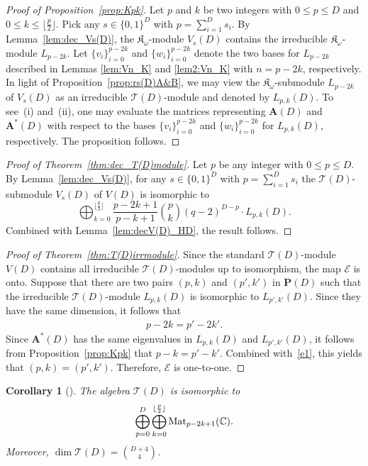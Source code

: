 \documentclass[pdftex]{sigma}%
\def\A{\mathbf A}
\def\C{\mathbb C}
\def\K{\mathfrak K_\omega}
\def\Mat{{\rm Mat}}
\def\T{\mathcal T}
\numberwithin{equation}{section}
\newtheorem{Corollary}[Theorem]{Corollary}
\begin{document}
\begin{proof}[Proof of Proposition~\ref{prop:Kpk}]
Let $p$ and $k$ be two integers with $0\leq p\leq D$ and $0\leq k\leq \lfloor \frac{p}{2}\rfloor$. Pick any $s\in \{0,1\}^D$ with $p=\sum_{i=1}^D s_i$.
By Lemma~\ref{lem:dec_Vs(D)}, the $\K$-module $V_s(D)$ contains the irreducible $\K$-module $L_{p-2k}$. Let $\{v_i\}_{i=0}^{p-2k}$ and $\{w_i\}_{i=0}^{p-2k}$ denote the two bases for $L_{p-2k}$ described in Lemmas \ref{lem:Vn_K} and \ref{lem2:Vn_K} with $n=p-2k$, respectively. In light of Proposition~\ref{prop:rs(D)A&B}, we may view the $\K$-submodule $L_{p-2k}$ of $V_s(D)$ as an irreducible $\T(D)$-module and denoted by $L_{p,k}(D)$.
To see~(i) and~(ii), one may evaluate the matrices representing $\A(D)$ and $\A^*(D)$ with respect to the bases $\{v_i\}_{i=0}^{p-2k}$ and $\{w_i\}_{i=0}^{p-2k}$ for $L_{p,k}(D)$, respectively. The proposition follows.
\end{proof}

\begin{proof}[Proof of Theorem~\ref{thm:dec_T(D)module}]
Let $p$ be any integer with $0\leq p\leq D$.
By Lemma~\ref{lem:dec_Vs(D)}, for any $s\in \{0,1\}^D$ with $p=\sum_{i=1}^D s_i$ the $\T(D)$-submodule $V_s(D)$ of $V(D)$ is isomorphic to
\[
\bigoplus_{k=0}^{\lfloor \frac{p}{2}\rfloor}
\frac{p-2k+1}{p-k+1}{p\choose k}(q-2)^{D-p}\cdot L_{p,k}(D).
\]
Combined with Lemma~\ref{lem:decV(D)_HD}, the result follows.
\end{proof}

\begin{proof}[Proof of Theorem~\ref{thm:T(D)irrmodule}]
Since the standard $\T(D)$-module $V(D)$ contains all irreducible \linebreak $\T(D)$-modules up to isomorphism,
 the map $\mathcal E$ is onto.
 Suppose that there are two pairs $(p,k)$ and $(p',k')$ in $\mathbf P(D)$ such that the irreducible $\T(D)$-module $L_{p,k}(D)$ is isomorphic to $L_{p',k'}(D)$. Since they have the same dimension, it follows that
\begin{gather}\label{e1}
p-2k=p'-2k'.
\end{gather}
Since $\A^*(D)$ has the same eigenvalues in $L_{p,k}(D)$ and $L_{p',k'}(D)$,
it follows from Proposition~\ref{prop:Kpk} that $p-k=p'-k'$.
Combined with~\eqref{e1}, this yields that $(p,k)=(p',k')$. Therefore, $\mathcal E$ is one-to-one.
\end{proof}

\begin{Corollary}[{\cite[Corollary 3.7]{Hamming2006}}]\label{cor:dimT(D)}
The algebra $\T(D)$ is isomorphic to
\[
\bigoplus_{p=0}^D
\bigoplus_{k=0}^{\lfloor \frac{p}{2}\rfloor}
\Mat_{p-2k+1}(\C).
\]
Moreover, $\dim \T(D)={D+4\choose 4}$.
\end{Corollary}
\end{document}
